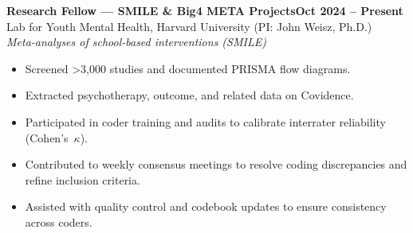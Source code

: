 \documentclass[10pt, letterpaper]{article}
\newenvironment{expitems}{
    \begin{itemize}[
        leftmargin=8pt,
        itemsep=1pt,
        topsep=2pt,
        parsep=0pt,
        partopsep=0pt
    ]
}{\end{itemize}}
\newcommand{\expheading}[2]{\noindent\textbf{#1}\hfill\textbf{#2}\\}
\newcommand{\expinfo}[1]{\noindent #1\\}
\newcommand{\expscope}[1]{\noindent\textit{#1}\\}
\begin{document}
\vspace{2pt}
\expheading{Research Fellow — SMILE \& Big4 META Projects}{Oct 2024 -- Present}
\expinfo{Lab for Youth Mental Health, Harvard University (PI: John Weisz, Ph.D.)}
\vspace{3pt}
\expscope{Meta-analyses of school-based interventions (SMILE)}
\begin{expitems}
    \item Screened >3{,}000 studies and documented PRISMA flow diagrams.
    \item Extracted psychotherapy, outcome, and related data on Covidence.
    \item Participated in coder training and audits to calibrate interrater reliability (Cohen’s~$\kappa$).
    \item Contributed to weekly consensus meetings to resolve coding discrepancies and refine inclusion criteria.
    \item Assisted with quality control and codebook updates to ensure consistency across coders.
\end{expitems}
\end{document}
